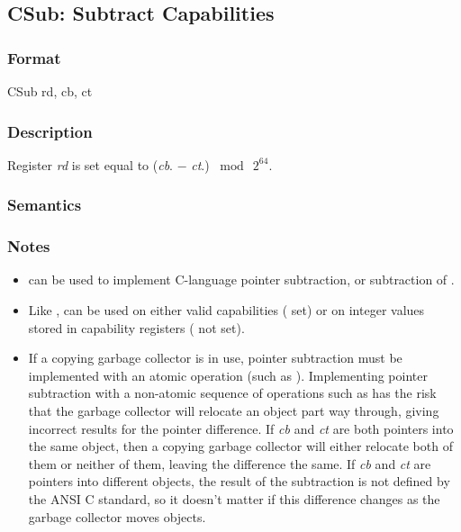 \clearpage
{}
{}
\subsection*{CSub: Subtract Capabilities}

\subsubsection*{Format}

CSub rd, cb, ct

\begin{center}
\end{center}

\subsubsection*{Description}

Register \emph{rd} is set equal to (\emph{cb}.\ccursor{} $-$ \emph{ct}.\ccursor{}) $\bmod~2^{64}$.

\subsubsection*{Semantics}


\subsubsection*{Notes}

\begin{itemize}
\item
{} can be used to implement C-language pointer subtraction,
or subtraction of .
\item
Like ,  can be used on either
valid capabilities (\ctag{} set) or on integer values stored in capability
registers (\ctag{} not set).
\item
If a copying garbage collector is in use, pointer subtraction must be
implemented with an atomic operation (such as ).
Implementing pointer subtraction with a non-atomic sequence of operations such
as  has the risk that the garbage collector will
relocate an object part way through, giving incorrect results for the
pointer difference. If \emph{cb} and \emph{ct} are both pointers into the
same object, then a copying garbage collector will either relocate both of
them or neither of them, leaving the difference the same.
If \emph{cb} and \emph{ct} are pointers into
different objects, the result of the subtraction is not defined by the ANSI
C standard, so it doesn't matter if this difference changes as the garbage
collector moves objects.
\end{itemize}
